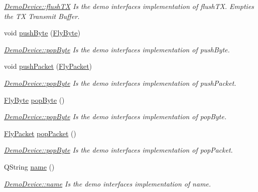 \begin{DoxyCompactItemize}
\begin{DoxyCompactList}\small\item\em \hyperlink{class_demo_device_a32e89c17f613abfa7f2a4d9f970bbffe}{Demo\+Device\+::flush\+TX} Is the demo interface\textquotesingle{}s implementation of flush\+TX. Empties the TX Transmit Buffer. \end{DoxyCompactList}\item 
void \hyperlink{class_demo_device_a064f0bc683663200243bd68ff3713c68}{push\+Byte} (\hyperlink{conversions_8h_a1f006e31a957accfe6aa1bf6f401efce}{Fly\+Byte})
\begin{DoxyCompactList}\small\item\em \hyperlink{class_demo_device_a788dd7e426fab9c8d19ea9fd106260d4}{Demo\+Device\+::pop\+Byte} Is the demo interface\textquotesingle{}s implementation of push\+Byte. \end{DoxyCompactList}\item 
void \hyperlink{class_demo_device_ac39f46589b28926cd40635ad42342a54}{push\+Packet} (\hyperlink{class_fly_packet}{Fly\+Packet})
\begin{DoxyCompactList}\small\item\em \hyperlink{class_demo_device_a788dd7e426fab9c8d19ea9fd106260d4}{Demo\+Device\+::pop\+Byte} Is the demo interface\textquotesingle{}s implementation of push\+Packet. \end{DoxyCompactList}\item 
\hyperlink{conversions_8h_a1f006e31a957accfe6aa1bf6f401efce}{Fly\+Byte} \hyperlink{class_demo_device_a788dd7e426fab9c8d19ea9fd106260d4}{pop\+Byte} ()
\begin{DoxyCompactList}\small\item\em \hyperlink{class_demo_device_a788dd7e426fab9c8d19ea9fd106260d4}{Demo\+Device\+::pop\+Byte} Is the demo interface\textquotesingle{}s implementation of pop\+Byte. \end{DoxyCompactList}\item 
\hyperlink{class_fly_packet}{Fly\+Packet} \hyperlink{class_demo_device_a6e755f50f52301b9166e278fe6851e88}{pop\+Packet} ()
\begin{DoxyCompactList}\small\item\em \hyperlink{class_demo_device_a788dd7e426fab9c8d19ea9fd106260d4}{Demo\+Device\+::pop\+Byte} Is the demo interface\textquotesingle{}s implementation of pop\+Packet. \end{DoxyCompactList}\item 
Q\+String \hyperlink{class_demo_device_acde538bd5a71a8d4df6293876169545c}{name} ()
\begin{DoxyCompactList}\small\item\em \hyperlink{class_demo_device_acde538bd5a71a8d4df6293876169545c}{Demo\+Device\+::name} Is the demo interface\textquotesingle{}s implementation of name. \end{DoxyCompactList}\end{DoxyCompactItemize}


